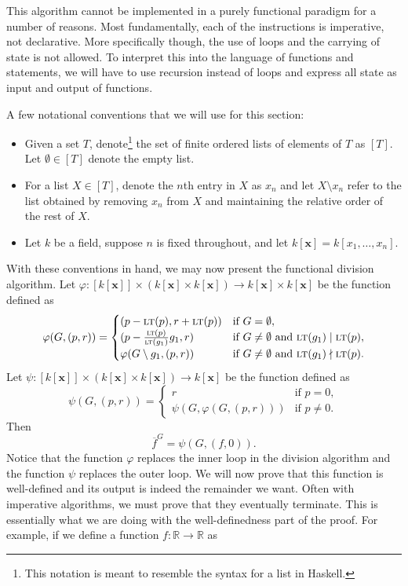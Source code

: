\documentclass[MS, xcolor=dvipsnames]{wfuthesis}
\def\bR{\mathbb{R}}
\newcommand{\LT}{\ensuremath{\text{\sc lt}}}
\def\and{\text{ and }}
\theoremstyle{definition}
\def\p{\varphi}
\begin{document}
This algorithm cannot be implemented in a purely functional paradigm for a number of reasons. Most fundamentally, each of the instructions is imperative, not declarative. More specifically though, the use of loops and the carrying of state is not allowed. To interpret this into the language of functions and statements, we will have to use recursion instead of loops and express all state as input and output of functions. \par
A few notational conventions that we will use for this section:
\begin{itemize}
  \item Given a set $T$, denote\footnote{This notation is meant to resemble the syntax for a list in Haskell.} the set of finite ordered lists of elements of $T$ as $[T]$. Let $\emptyset \in [T]$ denote the empty list.
  \item For a list $X \in [T]$, denote the $n$th entry in $X$ as $x_n$ and let $X \setminus x_n$ refer to the list obtained by removing $x_n$ from $X$ and maintaining the relative order of the rest of $X$.
  \item Let $k$ be a field, suppose $n$ is fixed throughout, and let $k[\mathbf x] = k[x_1,\dots,x_n]$.
\end{itemize}
With these conventions in hand, we may now present the functional division algorithm. Let $\p: [k[\mathbf x]] \times \left( k[\mathbf x] \times k[\mathbf x] \right) \to k[\mathbf x] \times k[\mathbf x]$ be the function defined as
\[ \p(G,(p,r)) = \begin{cases} (p-\LT(p),r+\LT(p)) &\text{if } G = \emptyset, \\ (p-\frac{\LT(p)}{\LT(g_1)}g_1,r) &\text{if } G \ne \emptyset \and \LT(g_1) \mid \LT(p), \\ \p(G\setminus g_1,(p,r)) &\text{if } G \ne \emptyset \and \LT(g_1) \nmid \LT(p). \end{cases} \]
Let $\psi: [k[\mathbf x]] \times \left( k[\mathbf x] \times k[\mathbf x] \right) \to k[\mathbf x]$ be the function defined as
\[ \psi(G,(p,r)) = \begin{cases} r &\text{if } p = 0, \\ \psi(G,\p(G,(p,r))) &\text{if } p \ne 0. \end{cases} \]
Then
\[ \overline f^{G} = \psi(G,(f,0)). \]
Notice that the function $\p$ replaces the inner loop in the division algorithm and the function $\psi$ replaces the outer loop. We will now prove that this function is well-defined and its output is indeed the remainder we want. Often with imperative algorithms, we must prove that they eventually terminate. This is essentially what we are doing with the well-definedness part of the proof. For example, if we define a function $f: \bR \to \bR$ as
\end{document}
